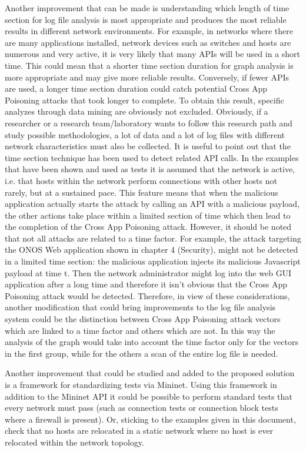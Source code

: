 {Another improvement that can be made is understanding which length of time section for log file analysis is most appropriate and produces the most reliable results in different network environments. For example, in networks where there are many applications installed, network devices such as switches and hosts are numerous and very active, it is very likely that many APIs will be used in a short time. This could mean that a shorter time section duration for graph analysis is more appropriate and may give more reliable results. Conversely, if fewer APIs are used, a longer time section duration could catch potential Cross App Poisoning attacks that took longer to complete. To obtain this result, specific analyzes through data mining are obviously not excluded. Obviously, if a researcher or a research team/laboratory wants to follow this research path and study possible methodologies, a lot of data and a lot of log files with different network characteristics must also be collected. It is useful to point out that the time section technique has been used to detect related API calls. In the examples that have been shown and used as tests it is assumed that the network is active, i.e. that hosts within the network perform connections with other hosts not rarely, but at a sustained pace. This feature means that when the malicious application actually starts the attack by calling an API with a malicious payload, the other actions take place within a limited section of time which then lead to the completion of the Cross App Poisoning attack. However, it should be noted that not all attacks are related to a time factor. For example, the attack targeting the ONOS Web application shown in chapter 4 (Security), might not be detected in a limited time section: the malicious application injects its malicious Javascript payload at time t. Then the network administrator might log into the web GUI application after a long time and therefore it isn't obvious that the Cross App Poisoning attack would be detected. Therefore, in view of these considerations, another modification that could bring improvements to the log file analysis system could be the distinction between Cross App Poisoning attack vectors which are linked to a time factor and others which are not. In this way the analysis of the graph would take into account the time factor only for the vectors in the first group, while for the others a scan of the entire log file is needed.
\medskip

Another improvement that could be studied and added to the proposed solution is a framework for standardizing tests via Mininet. Using this framework in addition to the Mininet API it could be possible to perform standard tests that every network must pass (such as connection tests or connection block tests where a firewall is present). Or, sticking to the examples given in this document, check that no hosts are relocated in a static network where no host is ever relocated within the network topology.
\medskip

}
